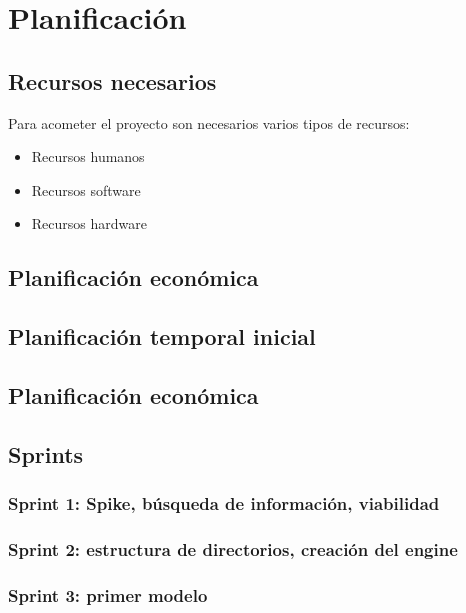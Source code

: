 
\chapter{Planificación}
\label{chap:planificación}

\section{Recursos necesarios}

Para acometer el proyecto son necesarios varios tipos de recursos:

\begin{itemize}
    \item Recursos humanos
    \item Recursos software
    \item Recursos hardware
\end{itemize}

\section{Planificación económica}

\section{Planificación temporal inicial}

\section{Planificación económica}

\section{Sprints}

\subsection{Sprint 1: Spike, búsqueda de información, viabilidad}
\subsection{Sprint 2: estructura de directorios, creación del engine}
\subsection{Sprint 3: primer modelo}
